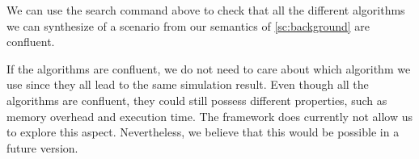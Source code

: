 We can use the search command above to check that all the different algorithms we can synthesize of a scenario from our semantics of \cref{sc:background} are confluent.


If the algorithms are confluent, we do not need to care about which algorithm we use since they all lead to the same simulation result.
Even though all the algorithms are confluent, they could still possess different properties, such as memory overhead and execution time. 
The framework does currently not allow us to explore this aspect.
Nevertheless, we believe that this would be possible in a future version.